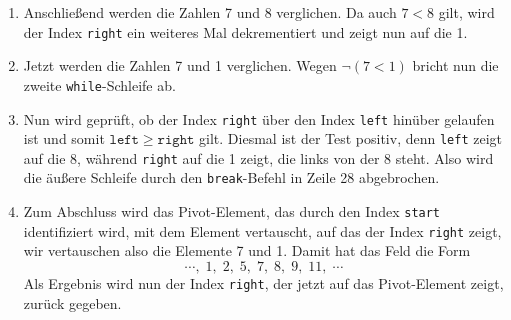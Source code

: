 \begin{enumerate}
\item Anschlie{\ss}end werden die Zahlen 7 und 8 verglichen.  Da auch $7 < 8$ gilt, wird der
      Index \texttt{right} ein weiteres Mal dekrementiert und zeigt nun auf die 1.
\item Jetzt werden die Zahlen 7 und 1 verglichen.  Wegen $\neg (7 < 1)$ bricht nun die
      zweite \texttt{while}-Schleife ab.
\item Nun wird gepr\"uft, ob der Index \texttt{right} \"uber den Index
      \texttt{left} hin\"uber gelaufen ist und somit $\mathtt{left} \geq \mathtt{right}$
      gilt.  Diesmal ist der Test positiv, denn \texttt{left} zeigt auf die 8,
      w\"ahrend \texttt{right} auf die 1 zeigt, die links von der 8 steht.
      Also wird die \"au{\ss}ere Schleife durch den \texttt{break}-Befehl in Zeile 28
      abgebrochen.
\item Zum Abschluss wird das Pivot-Element, das durch den Index \texttt{start}
      identifiziert wird, mit dem Element vertauscht, auf das der Index \texttt{right}
      zeigt,  wir vertauschen also die Elemente 7 und 1.  Damit hat das Feld die Form
      \[ \cdots,\; 1,\; 2,\; 5,\; 7,\; 8,\; 9,\; 11,\;\cdots \]
      Als Ergebnis wird nun der Index \texttt{right}, der jetzt auf das Pivot-Element
      zeigt, zur\"uck gegeben.
\end{enumerate}
 
